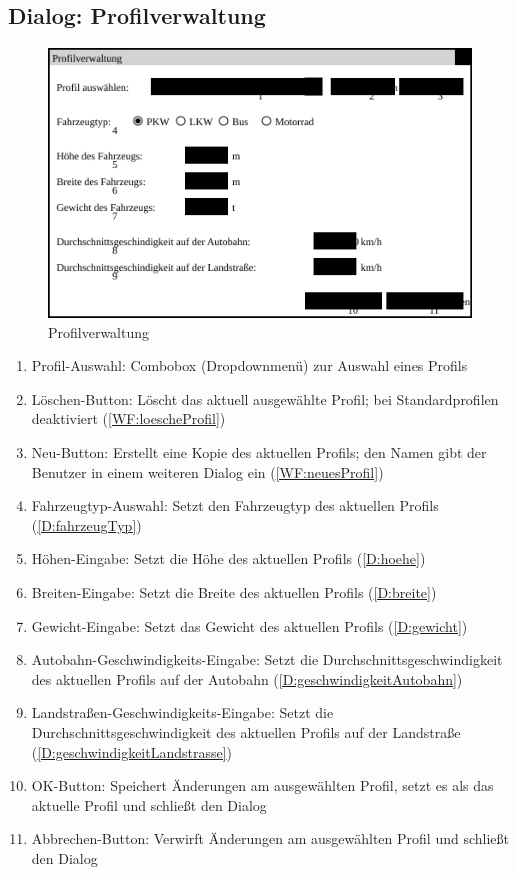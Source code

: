 \documentclass[a4paper, 11pt]{article}
\begin{document}
\subsection{Dialog: Profilverwaltung}
\begin{figure}[H]
\centering
\includegraphics[width=0.7\linewidth]{Profilverwaltung}
\caption{Profilverwaltung}
\label{fig:mockupprofilverwaltung}
\end{figure}
\begin{enumerate}
\item Profil-Auswahl: Combobox (Dropdownmenü) zur Auswahl eines Profils
\item Löschen-Button: Löscht das aktuell ausgewählte Profil; bei Standardprofilen deaktiviert (\ref{WF:loescheProfil})
\item Neu-Button: Erstellt eine Kopie des aktuellen Profils; den Namen gibt der Benutzer in einem weiteren Dialog ein (\ref{WF:neuesProfil})
\item Fahrzeugtyp-Auswahl: Setzt den Fahrzeugtyp des aktuellen Profils (\ref{D:fahrzeugTyp})
\item Höhen-Eingabe: Setzt die Höhe des aktuellen Profils (\ref{D:hoehe})
\item Breiten-Eingabe: Setzt die Breite des aktuellen Profils (\ref{D:breite})
\item Gewicht-Eingabe: Setzt das Gewicht des aktuellen Profils (\ref{D:gewicht})
\item Autobahn-Geschwindigkeits-Eingabe: Setzt die Durchschnittsgeschwindigkeit des aktuellen Profils auf der Autobahn (\ref{D:geschwindigkeitAutobahn})
\item Landstraßen-Geschwindigkeits-Eingabe: Setzt die Durchschnittsgeschwindigkeit des aktuellen Profils auf der Landstraße (\ref{D:geschwindigkeitLandstrasse})
\item OK-Button: Speichert Änderungen am ausgewählten Profil, setzt es als das aktuelle Profil und schließt den Dialog
\item Abbrechen-Button: Verwirft Änderungen am ausgewählten Profil und schließt den Dialog
\end{enumerate}
\end{document}
